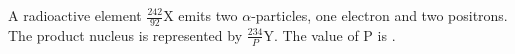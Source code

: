 \item A radioactive element $\frac{242}{92}$X emits two $\alpha$-particles, one electron and two positrons. The product nucleus is represented by $\frac{234}{P}$Y. The value of P is \underline{\hspace{1.5cm}}.
